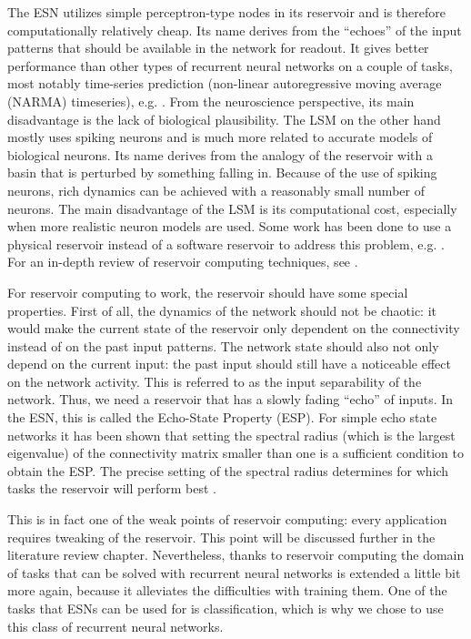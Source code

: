 \documentclass[10pt,a4paper]{report}
\begin{document}
The ESN utilizes simple perceptron-type nodes in its reservoir and is therefore computationally relatively cheap. Its name derives from the ``echoes'' of the input patterns that should be available in the network for readout. It gives better performance than other types of recurrent neural networks on a couple of tasks, most notably time-series prediction (non-linear autoregressive moving
average (NARMA) timeseries), e.g. \citet{Jaeger2004}. From the neuroscience perspective, its main disadvantage is the lack of biological plausibility. The LSM on the other hand mostly uses spiking neurons and is much more related to accurate models of biological neurons. Its name derives from the analogy of the reservoir with a basin that is perturbed by something falling in. Because of the use of spiking neurons, rich dynamics can be achieved with a reasonably small number of neurons. The main disadvantage of the LSM is its computational cost, especially when more realistic neuron models are used. Some work has been done to use a physical reservoir instead of a software reservoir to address this problem, e.g. \citet{Paquot2012}. For an in-depth review of reservoir computing techniques, see \citet{Schrauwen2007}.

For reservoir computing to work, the reservoir should have some special properties. First of all, the dynamics of the network should not be chaotic: it would make the current state of the reservoir only dependent on the connectivity instead of on the past input patterns. The network state should also not only depend on the current input: the past input should still have a noticeable effect on the network activity. This is referred to as the input separability of the network. Thus, we need a reservoir that has a slowly fading ``echo'' of inputs. In the ESN, this is called the Echo-State Property (ESP). For simple echo state networks it has been shown that setting the spectral radius (which is the largest eigenvalue) of the connectivity matrix smaller than one is a sufficient condition to obtain the ESP. The precise setting of the spectral radius determines for which tasks the reservoir will perform best \citep{Jaeger2001}. 

This is in fact one of the weak points of reservoir computing: every application requires tweaking of the reservoir. This point will be discussed further in the literature review chapter. Nevertheless, thanks to reservoir computing the domain of tasks that can be solved with recurrent neural networks is extended a little bit more again, because it alleviates the difficulties with training them. One of the tasks that ESNs can be used for is classification, which is why we chose to use this class of recurrent neural networks.
\end{document}
